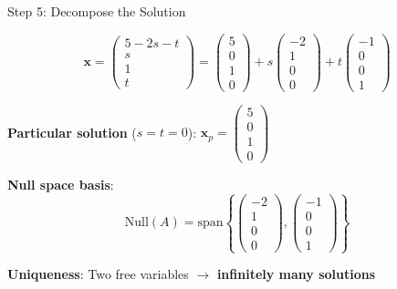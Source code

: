 \documentclass[10pt]{beamer}
\theoremstyle{definition}
\newcommand{\x}[1]{\alert{\textbf{#1}}}
\begin{document}
\begin{frame}{Step 5: Decompose the Solution}

$$\mathbf{x} = \begin{pmatrix} 5 - 2s - t \\ s \\ 1 \\ t \end{pmatrix} = \begin{pmatrix} 5 \\ 0 \\ 1 \\ 0 \end{pmatrix} + s\begin{pmatrix} -2 \\ 1 \\ 0 \\ 0 \end{pmatrix} + t\begin{pmatrix} -1 \\ 0 \\ 0 \\ 1 \end{pmatrix}$$

\vspace{1em}

\x{Particular solution} ($s = t = 0$): $\mathbf{x}_p = \begin{pmatrix} 5 \\ 0 \\ 1 \\ 0 \end{pmatrix}$

\vspace{0.5em}

\x{Null space basis}:
$$\text{Null}(A) = \text{span}\left\{\begin{pmatrix} -2 \\ 1 \\ 0 \\ 0 \end{pmatrix}, \begin{pmatrix} -1 \\ 0 \\ 0 \\ 1 \end{pmatrix}\right\}$$

\vspace{0.5em}

\x{Uniqueness}: Two free variables $\to$ \textbf{infinitely many solutions}

\end{frame}
\end{document}
